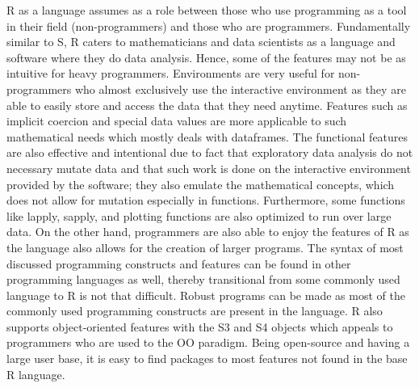 \documentclass[12pt]{article}
\begin{document}
R as a language assumes as a role between those who use programming as a tool in their field (non-programmers) and those who are programmers. Fundamentally similar to S, R caters to mathematicians and data scientists as a language and software where they do data analysis. Hence, some of the features may not be as intuitive for heavy programmers. Environments are very useful for non-programmers who almost exclusively use the interactive environment as they are able to easily store and access the data that they need anytime. Features such as implicit coercion and special data values are more applicable to such mathematical needs which mostly deals with dataframes. The functional features are also effective and intentional due to fact that exploratory data analysis do not necessary mutate data and that such work is done on the interactive environment provided by the software; they also emulate the mathematical concepts, which does not allow for mutation especially in functions. Furthermore, some functions like lapply, sapply, and plotting functions are also optimized to run over large data. On the other hand, programmers are also able to enjoy the features of R as the language also allows for the creation of larger programs. The syntax of most discussed programming constructs and features can be found in other programming languages as well, thereby transitional from some commonly used language to R is not that difficult. Robust programs can be made as most of the commonly used programming constructs are present in the language. R also supports object-oriented features with the S3 and S4 objects which appeals to programmers who are used to the OO paradigm. Being open-source and having a large user base, it is easy to find packages to most features not found in the base R language.

\end{document}
